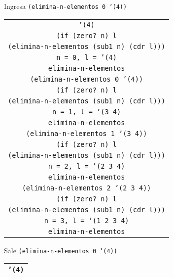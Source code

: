 \documentclass[letterpaper,11pt]{article}
\begin{document}
\begin{enumerate}
\begin{enumerate}
        Ingresa \texttt{(elimina-n-elementos 0 '(4))}
        \begin{center}
            \begin{tabular}[h]{|c|}
                \hline
                \texttt{'(4)} \\
                \texttt{(if (zero? n) l} \\
                \texttt{(elimina-n-elementos (sub1 n) (cdr l)))} \\
                \texttt{n = 0, l = '(4)} \\
                \texttt{elimina-n-elementos} \\
                \hline
                \hline
                \texttt{(elimina-n-elementos 0 '(4))} \\
                \texttt{(if (zero? n) l} \\
                \texttt{(elimina-n-elementos (sub1 n) (cdr l)))} \\
                \texttt{n = 1, l = '(3 4)} \\
                \texttt{elimina-n-elementos} \\
                \hline
                \hline
                \texttt{(elimina-n-elementos 1 '(3 4))} \\
                \texttt{(if (zero? n) l} \\
                \texttt{(elimina-n-elementos (sub1 n) (cdr l)))} \\
                \texttt{n = 2, l = '(2 3 4)} \\
                \texttt{elimina-n-elementos} \\
                \hline
                \hline
                \texttt{(elimina-n-elementos 2 '(2 3 4))} \\
                \texttt{(if (zero? n) l} \\
                \texttt{(elimina-n-elementos (sub1 n) (cdr l)))} \\
                \texttt{n = 3, l = '(1 2 3 4)} \\
                \texttt{elimina-n-elementos} \\
                \hline
                \hline
            \end{tabular}
        \end{center}

        Sale \texttt{(elimina-n-elementos 0 '(4))}
        \begin{center}
            \begin{tabular}[h]{|c|}
                \hline
                \texttt{'(4)} \\
                \hline
            \end{tabular}
        \end{center}


\end{enumerate}
\end{enumerate}
\end{document}
